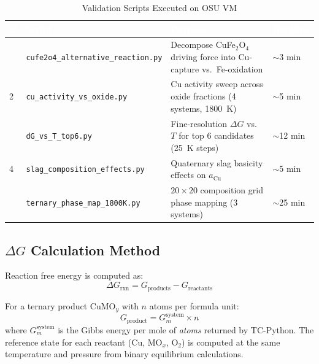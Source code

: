 \documentclass[11pt]{article}
\begin{document}
\begin{table}[H]
\caption{Validation Scripts Executed on OSU VM}
\label{tab:scripts}
\centering
\renewcommand{\arraystretch}{1.3}
\setlength{\arrayrulewidth}{0.8pt}
\begin{tabular}{|>{\centering\arraybackslash}p{0.3in}|>{\raggedright\arraybackslash}p{2.2in}|>{\raggedright\arraybackslash}p{2.7in}|>{\centering\arraybackslash}p{0.6in}|}
\hline
\rowcolor{headercolor}
\textcolor{white}{\textbf{\#}} & \textcolor{white}{\textbf{Script}} & \textcolor{white}{\textbf{Purpose}} & \textcolor{white}{\textbf{Runtime}} \\
\hline
1 & \texttt{cufe2o4\_alternative\_reaction.py} & Decompose CuFe$_2$O$_4$ driving force into Cu-capture vs.\ Fe-oxidation & $\sim$3 min \\
\hline
\rowcolor{altrow}
2 & \texttt{cu\_activity\_vs\_oxide.py} & Cu activity sweep across oxide fractions (4 systems, \SI{1800}{\kelvin}) & $\sim$5 min \\
\hline
3 & \texttt{dG\_vs\_T\_top6.py} & Fine-resolution $\Delta G$ vs.\ $T$ for top 6 candidates (25~K steps) & $\sim$12 min \\
\hline
\rowcolor{altrow}
4 & \texttt{slag\_composition\_effects.py} & Quaternary slag basicity effects on $a_{\text{Cu}}$ & $\sim$5 min \\
\hline
5 & \texttt{ternary\_phase\_map\_1800K.py} & $20 \times 20$ composition grid phase mapping (3 systems) & $\sim$25 min \\
\hline
\end{tabular}
\end{table}

\subsection{$\Delta G$ Calculation Method}

Reaction free energy is computed as:
\begin{equation}
    \Delta G_{\text{rxn}} = G_{\text{products}} - G_{\text{reactants}}
    \label{eq:dG}
\end{equation}

For a ternary product CuMO$_y$ with $n$ atoms per formula unit:
\begin{equation}
    G_{\text{product}} = G_m^{\text{system}} \times n
\end{equation}
where $G_m^{\text{system}}$ is the Gibbs energy per mole of \textit{atoms} returned by TC-Python. The reference state for each reactant (Cu, MO$_x$, O$_2$) is computed at the same temperature and pressure from binary equilibrium calculations.
\end{document}
